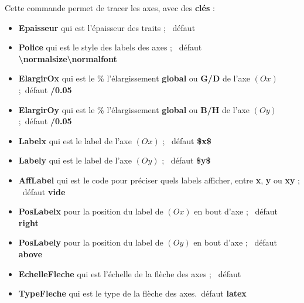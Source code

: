 \documentclass[a4paper,french,11pt]{article}
\newcommand\cmaj[1]{%
	{\tcbox[vignetteMaJ]{#1}\xspace}%
}
\newcommand\Cle[1]{{\bfseries\sffamily\textlangle #1\textrangle}}
\begin{document}
\begin{codecles}
Cette commande permet de tracer les axes, avec des \Cle{clés} :

\begin{itemize}
	\item \Cle{Epaisseur} qui est l'épaisseur des traits ; \hfill~défaut \Cle{1.25pt}
	\item \Cle{Police} qui est le style des labels des axes  ; \hfill~défaut \Cle{\textbackslash{}normalsize\textbackslash{}normalfont}
	\item \cmaj{2.1.2} \Cle{ElargirOx} qui est le \% l'élargissement \Cle{global} ou \Cle{G/D} de l'axe $(Ox)$ ;\hfill~défaut \Cle{0/0.05}
	\item \cmaj{2.1.2} \Cle{ElargirOy} qui est le \% l'élargissement \Cle{global} ou \Cle{B/H} de l'axe $(Oy)$ ;\hfill~défaut \Cle{0/0.05}
	\item \Cle{Labelx} qui est le label de l'axe $(Ox)$ ; \hfill~défaut \Cle{\${}x\$}
	\item \Cle{Labely} qui est le label de l'axe $(Oy)$ ; \hfill~défaut \Cle{\${}y\$}
	\item \Cle{AffLabel} qui est le code pour préciser quels labels afficher, entre \Cle{x}, \Cle{y} ou \Cle{xy} ; \hfill~défaut \Cle{vide}
	\item \Cle{PosLabelx} pour la position du label de $(Ox)$ en bout d'axe ; \hfill~défaut \Cle{right}
	\item \Cle{PosLabely} pour la position du label de $(Oy)$ en bout d'axe ; \hfill~défaut \Cle{above}
	\item \Cle{EchelleFleche} qui est l'échelle de la flèche des axes ; \hfill~défaut \Cle{1}
	\item \Cle{TypeFleche} qui est le type de la flèche des axes.\hfill~défaut \Cle{latex}
\end{itemize}
\end{codecles}

\begin{codetex}
	\AxesTikz

	\AxesTikz%
		[AffLabel=xy,Labelx={Année},Labely={Altitude},%
		PosLabelx={below right},PosLabely={above left},%
		Police=\small\sffamily]
\end{codetex}

\begin{codesortie}
\hfill~
\begin{tikzpicture}%
	[x=0.3cm,y=0.06cm,%
	Ox=1992,xmin=1992,xmax=2012,xgrille=2,xgrilles=1,%
	Oy=1640,ymin=1640,ymax=1730,ygrille=10,ygrilles=5]
	\AxesTikz
\end{tikzpicture}
~~
\begin{tikzpicture}%
	[x=0.3cm,y=0.06cm,%
	Ox=1992,xmin=1992,xmax=2012,xgrille=2,xgrilles=1,%
	Oy=1640,ymin=1640,ymax=1730,ygrille=10,ygrilles=5]
	\AxesTikz%
		[AffLabel=xy,Labelx={Année},Labely={Altitude},%
		PosLabelx={below right},PosLabely={above left},%
		Police=\small\sffamily]
\end{tikzpicture}
\hfill~
\end{codesortie}
\end{document}
